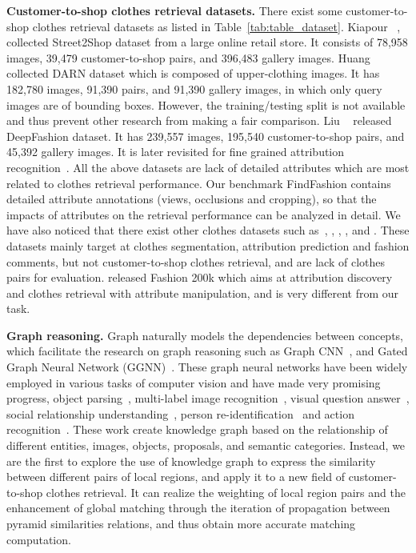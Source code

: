 \documentclass[10pt,twocolumn,letterpaper]{article}
\begin{document}
\textbf{Customer-to-shop clothes retrieval datasets.} There exist some customer-to-shop clothes retrieval datasets as listed in Table~\ref{tab:table_dataset}. Kiapour \etal~\cite{Kiapour2015}, collected Street2Shop dataset from a large online retail store. It consists of 78,958 images, 39,479 customer-to-shop pairs, and 396,483 gallery images. Huang \etal~\cite{Huang2015} collected DARN dataset which is composed of upper-clothing images. It has 182,780 images, 91,390 pairs, and 91,390 gallery images, in which only query images are of bounding boxes. However, the training/testing split is not available and thus prevent other research from making a fair comparison.  Liu \etal~\cite{Liu2016} released DeepFashion dataset. It has 239,557 images, 195,540 customer-to-shop pairs, and 45,392 gallery images. It is later revisited for fine grained attribution recognition~\cite{Zakizadeh2018}. All the above datasets are lack of detailed attributes which are most related to clothes retrieval performance. Our benchmark FindFashion contains detailed attribute annotations (\eg views, occlusions and cropping), so that the impacts of attributes on the retrieval performance can be analyzed in detail. We have also noticed that there exist other clothes datasets such as~\cite{Bossard2013}, \cite{Chen}, \cite{Zheng2018}, \cite{Inoue2017}, \cite{Lin2018} and \cite{fashionai}. These datasets mainly target at clothes segmentation, attribution prediction and fashion comments, but not customer-to-shop clothes retrieval, and are lack of clothes pairs for evaluation. \cite{Han2017} released Fashion 200k which aims at attribution discovery and clothes retrieval with attribute manipulation,  and is very different from our task.



\textbf{Graph reasoning.} Graph naturally models the dependencies between concepts, which facilitate the research on graph reasoning such as Graph CNN~\cite{Duvenaud2015,Kipf2017,Schlichtkrull2018}, and Gated Graph Neural Network (GGNN)~\cite{Li2016}. These graph neural networks have been widely employed in various tasks of computer vision and have made very promising progress, \eg object parsing~\cite{Liang2017,Liang2016}, multi-label image recognition~\cite{Wang2017a}, visual question answer~\cite{Teney2017}, social relationship understanding~\cite{Wang2018a}, person re-identification~\cite{Shen2018} and action recognition~\cite{Wang}. These work create knowledge graph based on the relationship of different entities, \eg images, objects, proposals, and semantic categories. Instead, we are the first to explore the use of knowledge graph to express the similarity between different pairs of local regions, and apply it to a new field of customer-to-shop clothes retrieval. It can realize the weighting of local region pairs and the enhancement of global matching through the iteration of propagation between pyramid similarities relations, and thus obtain more accurate matching computation. 
\end{document}
